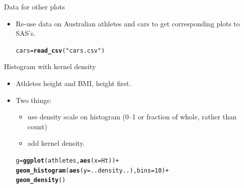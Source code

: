 \documentclass[unknownkeysallowed]{beamer}\usepackage[]{graphicx}\usepackage[]{color}
\makeatletter
\newcommand{\hlnum}[1]{\textcolor[rgb]{0.686,0.059,0.569}{#1}}%
\newcommand{\hlstr}[1]{\textcolor[rgb]{0.192,0.494,0.8}{#1}}%
\newcommand{\hlopt}[1]{\textcolor[rgb]{0,0,0}{#1}}%
\newcommand{\hlstd}[1]{\textcolor[rgb]{0.345,0.345,0.345}{#1}}%
\newcommand{\hlkwb}[1]{\textcolor[rgb]{0.69,0.353,0.396}{#1}}%
\newcommand{\hlkwc}[1]{\textcolor[rgb]{0.333,0.667,0.333}{#1}}%
\newcommand{\hlkwd}[1]{\textcolor[rgb]{0.737,0.353,0.396}{\textbf{#1}}}%
\newenvironment{kframe}{%
 \def\at@end@of@kframe{}%
 \ifinner\ifhmode%
  \def\at@end@of@kframe{\end{minipage}}%
  \begin{minipage}{\columnwidth}%
 \fi\fi%
 \def\FrameCommand##1{\hskip\@totalleftmargin \hskip-\fboxsep
 \colorbox{shadecolor}{##1}\hskip-\fboxsep
     \hskip-\linewidth \hskip-\@totalleftmargin \hskip\columnwidth}%
 \MakeFramed {\advance\hsize-\width
   \@totalleftmargin\z@ \linewidth\hsize
   \@setminipage}}%
 {\par\unskip\endMakeFramed%
 \at@end@of@kframe}
\newenvironment{knitrout}{}{} %
\makeatother
\begin{document}
\begin{frame}[fragile]{Data for other plots}
  
  \begin{itemize}
  \item Re-use data on Australian athletes and cars to get
    corresponding plots to SAS's.
\begin{knitrout}
\color{fgcolor}\begin{kframe}
\begin{alltt}
\hlstd{cars}\hlkwb{=}\hlkwd{read_csv}\hlstd{(}\hlstr{"cars.csv"}\hlstd{)}
\end{alltt}


{\ttfamily\noindent\itshape\color{messagecolor}{\#\# Parsed with column specification:\\\#\# cols(\\\#\#\ \  Car = col\_character(),\\\#\#\ \  MPG = col\_double(),\\\#\#\ \  Weight = col\_double(),\\\#\#\ \  Cylinders = col\_integer(),\\\#\#\ \  Horsepower = col\_integer(),\\\#\#\ \  Country = col\_character()\\\#\# )}}\end{kframe}
\end{knitrout}
  \end{itemize}
  
\end{frame}

\begin{frame}[fragile]{Histogram with kernel density}
  
  \begin{itemize}
  \item Athletes height and BMI, height first.
  \item Two things: 
    \begin{itemize}
    \item     use density scale on histogram (0--1 or fraction
    of whole, rather than count)
  \item add kernel density.
    \end{itemize}

\begin{knitrout}
\color{fgcolor}\begin{kframe}
\begin{alltt}
\hlstd{g}\hlkwb{=}\hlkwd{ggplot}\hlstd{(athletes,}\hlkwd{aes}\hlstd{(}\hlkwc{x}\hlstd{=Ht))}\hlopt{+}
    \hlkwd{geom_histogram}\hlstd{(}\hlkwd{aes}\hlstd{(}\hlkwc{y}\hlstd{=..density..),}\hlkwc{bins}\hlstd{=}\hlnum{10}\hlstd{)}\hlopt{+}
    \hlkwd{geom_density}\hlstd{()}
\end{alltt}
\end{kframe}
\end{knitrout}
  \end{itemize}
  
\end{frame}
\end{document}
